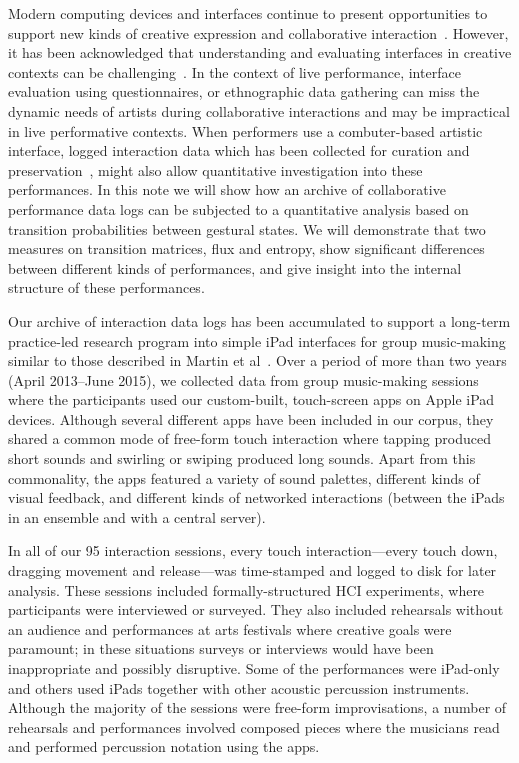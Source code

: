\documentclass{sigchi}
\begin{document}
Modern computing devices and interfaces continue to present
opportunities to support new kinds of creative expression and
collaborative interaction~\cite{Resnick:2005yu}. However, it has been
acknowledged that understanding and evaluating interfaces in creative
contexts can be challenging~\cite{Shneiderman:2007qv}. In the context
of live performance, interface evaluation using questionnaires, or
ethnographic data gathering can miss the dynamic needs of artists
during collaborative interactions and may be impractical in live
performative contexts. When performers use a combuter-based artistic
interface, logged interaction data which has been collected for
curation and preservation~\cite{England:2014ys}, might also allow
quantitative investigation into these performances. In this note we
will show how an archive of collaborative performance data logs can be
subjected to a quantitative analysis based on transition probabilities
between gestural states. We will demonstrate that two measures on
transition matrices, flux and entropy, show significant differences
between different kinds of performances, and give insight into the
internal structure of these performances.

Our archive of interaction data logs has been accumulated to support a
long-term practice-led research program into simple iPad interfaces
for group music-making similar to those described in Martin et
al~\cite{Martin:2014cr}. Over a period of more than two years (April
2013--June 2015), we collected data from group music-making sessions
where the participants used our custom-built, touch-screen apps on
Apple iPad devices. Although several different apps have been included
in our corpus, they shared a common mode of free-form touch
interaction where tapping produced short sounds and swirling or
swiping produced long sounds. Apart from this commonality, the apps
featured a variety of sound palettes, different kinds of visual
feedback, and different kinds of networked interactions (between the
iPads in an ensemble and with a central server).

In all of our 95 interaction sessions, every touch interaction---every
touch down, dragging movement and release---was time-stamped and
logged to disk for later analysis. These sessions included
formally-structured HCI experiments, where participants were
interviewed or surveyed. They also included rehearsals without an
audience and performances at arts festivals where creative goals were
paramount; in these situations surveys or interviews would have been
inappropriate and possibly disruptive. Some of the performances were
iPad-only and others used iPads together with other acoustic
percussion instruments. Although the majority of the sessions were
free-form improvisations, a number of rehearsals and performances
involved composed pieces where the musicians read and performed
percussion notation using the apps.
\end{document}
